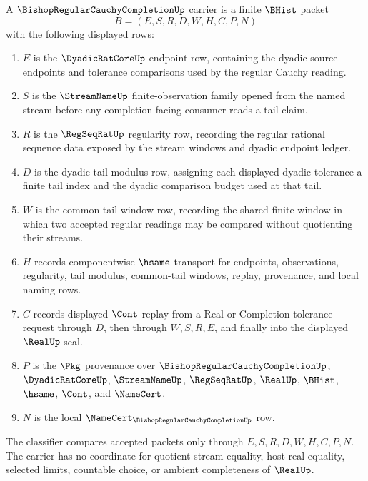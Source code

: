 \begin{definition}
\label{def:bishop-regular-cauchy-completion-carrier}
A $\BishopRegularCauchyCompletionUp$ carrier is a finite $\BHist$ packet
$$
B=(E,S,R,D,W,H,C,P,N)
$$
with the following displayed rows:
\begin{enumerate}
\item $E$ is the $\DyadicRatCoreUp$ endpoint row, containing the dyadic source endpoints and tolerance comparisons used by the regular Cauchy reading.
\item $S$ is the $\StreamNameUp$ finite-observation family opened from the named stream before any completion-facing consumer reads a tail claim.
\item $R$ is the $\RegSeqRatUp$ regularity row, recording the regular rational sequence data exposed by the stream windows and dyadic endpoint ledger.
\item $D$ is the dyadic tail modulus row, assigning each displayed dyadic tolerance a finite tail index and the dyadic comparison budget used at that tail.
\item $W$ is the common-tail window row, recording the shared finite window in which two accepted regular readings may be compared without quotienting their streams.
\item $H$ records componentwise $\hsame$ transport for endpoints, observations, regularity, tail modulus, common-tail windows, replay, provenance, and local naming rows.
\item $C$ records displayed $\Cont$ replay from a Real or Completion tolerance request through $D$, then through $W,S,R,E$, and finally into the displayed $\RealUp$ seal.
\item $P$ is the $\Pkg$ provenance over $\BishopRegularCauchyCompletionUp$, $\DyadicRatCoreUp$, $\StreamNameUp$, $\RegSeqRatUp$, $\RealUp$, $\BHist$, $\hsame$, $\Cont$, and $\NameCert$.
\item $N$ is the local $\NameCert_{\BishopRegularCauchyCompletionUp}$ row.
\end{enumerate}
The classifier compares accepted packets only through $E,S,R,D,W,H,C,P,N$. The carrier has no coordinate for quotient stream equality, host real equality, selected limits, countable choice, or ambient completeness of $\RealUp$.
\end{definition}

